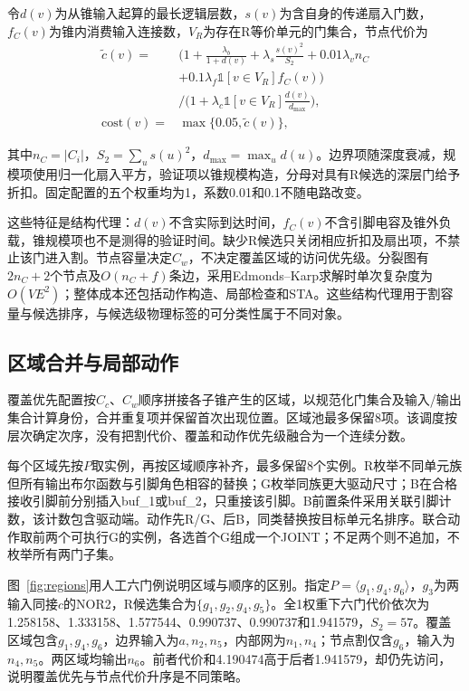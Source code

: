 \documentclass[twocolumn,10pt,fontset=windows]{ctexart}
\begin{document}
令$d(v)$为从锥输入起算的最长逻辑层数，$s(v)$为含自身的传递扇入门数，$f_C(v)$为锥内消费输入连接数，$V_R$为存在R等价单元的门集合，节点代价为
{\small
\begin{equation}\label{eq:cost}
\begin{aligned}
\widetilde c(v)={}&\Big(1+\frac{\lambda_b}{1+d(v)}
+\lambda_s\frac{s(v)^2}{S_2}+0.01\lambda_v n_C\\
&+0.1\lambda_f\mathbb{1}[v\in V_R]f_C(v)\Big)\\
&\Big/\Big(1+\lambda_c\mathbb{1}[v\in V_R]\frac{d(v)}{d_{\max}}\Big),\\
\mathrm{cost}(v)={}&\max\{0.05,\widetilde c(v)\},
\end{aligned}
\end{equation}
}

其中$n_C=|C_i|$，$S_2=\sum_u s(u)^2$，$d_{\max}=\max_u d(u)$。边界项随深度衰减，规模项使用归一化扇入平方，验证项以锥规模构造，分母对具有R候选的深层门给予折扣。固定配置的五个权重均为1，系数0.01和0.1不随电路改变。

这些特征是结构代理：$d(v)$不含实际到达时间，$f_C(v)$不含引脚电容及锥外负载，锥规模项也不是测得的验证时间。缺少R候选只关闭相应折扣及扇出项，不禁止该门进入割。节点容量决定$C_w$，不决定覆盖区域的访问优先级。分裂图有$2n_C+2$个节点及$O(n_C+f)$条边，采用Edmonds--Karp求解时单次复杂度为$O(VE^2)$；整体成本还包括动作构造、局部检查和STA。这些结构代理用于割容量与候选排序，与候选级物理标签的可分类性属于不同对象。

\subsection{区域合并与局部动作}\label{sec:schedule}

覆盖优先配置按$C_c$、$C_w$顺序拼接各子锥产生的区域，以规范化门集合及输入/输出集合计算身份，合并重复项并保留首次出现位置。区域池最多保留8项。该调度按层次确定次序，没有把割代价、覆盖和动作优先级融合为一个连续分数。

每个区域先按$P$取实例，再按区域顺序补齐，最多保留8个实例。R枚举不同单元族但所有输出布尔函数与引脚角色相容的替换；G枚举同族更大驱动尺寸；B在合格接收引脚前分别插入buf\_1或buf\_2，只重接该引脚。B前置条件采用关联引脚计数，该计数包含驱动端。动作先R/G、后B，同类替换按目标单元名排序。联合动作取前两个可执行G的实例，各选首个G组成一个JOINT；不足两个则不追加，不枚举所有两门子集。

图~\ref{fig:regions}用人工六门例说明区域与顺序的区别。指定$P=\langle g_1,g_4,g_6\rangle$，$g_3$为两输入同接$c$的NOR2，R候选集合为$\{g_1,g_2,g_4,g_5\}$。全1权重下六门代价依次为1.258158、1.333158、1.577544、0.990737、0.990737和1.941579，$S_2=57$。覆盖区域包含$g_1,g_4,g_6$，边界输入为$a,n_2,n_5$，内部网为$n_1,n_4$；节点割仅含$g_6$，输入为$n_4,n_5$。两区域均输出$n_6$。前者代价和4.190474高于后者1.941579，却仍先访问，说明覆盖优先与节点代价升序是不同策略。
\end{document}
